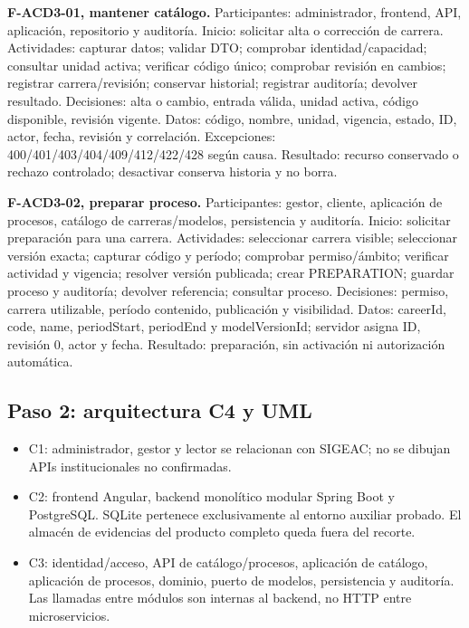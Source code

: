 \documentclass[11pt,a4paper]{article}
\providecommand{\tightlist}{\setlength{\itemsep}{0pt}\setlength{\parskip}{0pt}}
\begin{document}
\textbf{F-ACD3-01, mantener catálogo.} Participantes: administrador,
frontend, API, aplicación, repositorio y auditoría. Inicio: solicitar
alta o corrección de carrera. Actividades: capturar datos; validar DTO;
comprobar identidad/capacidad; consultar unidad activa; verificar código
único; comprobar revisión en cambios; registrar carrera/revisión;
conservar historial; registrar auditoría; devolver resultado.
Decisiones: alta o cambio, entrada válida, unidad activa, código
disponible, revisión vigente. Datos: código, nombre, unidad, vigencia,
estado, ID, actor, fecha, revisión y correlación. Excepciones:
400/401/403/404/409/412/422/428 según causa. Resultado: recurso
conservado o rechazo controlado; desactivar conserva historia y no
borra.

\textbf{F-ACD3-02, preparar proceso.} Participantes: gestor, cliente,
aplicación de procesos, catálogo de carreras/modelos, persistencia y
auditoría. Inicio: solicitar preparación para una carrera. Actividades:
seleccionar carrera visible; seleccionar versión exacta; capturar código
y período; comprobar permiso/ámbito; verificar actividad y vigencia;
resolver versión publicada; crear PREPARATION; guardar proceso y
auditoría; devolver referencia; consultar proceso. Decisiones: permiso,
carrera utilizable, período contenido, publicación y visibilidad. Datos:
careerId, code, name, periodStart, periodEnd y modelVersionId; servidor
asigna ID, revisión 0, actor y fecha. Resultado: preparación, sin
activación ni autorización automática.

\subsection{Paso 2: arquitectura C4 y
UML}\label{informe-paso-2-arquitectura-c4-y-uml}

\begin{itemize}
\tightlist
\item
  C1: administrador, gestor y lector se relacionan con SIGEAC; no se
  dibujan APIs institucionales no confirmadas.
\item
  C2: frontend Angular, backend monolítico modular Spring Boot y
  PostgreSQL. SQLite pertenece exclusivamente al entorno auxiliar
  probado. El almacén de evidencias del producto completo queda fuera
  del recorte.
\item
  C3: identidad/acceso, API de catálogo/procesos, aplicación de
  catálogo, aplicación de procesos, dominio, puerto de modelos,
  persistencia y auditoría. Las llamadas entre módulos son internas al
  backend, no HTTP entre microservicios.
\end{itemize}
\end{document}
